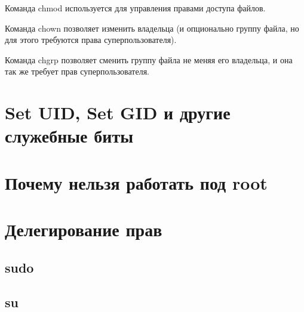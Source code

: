 Команда chmod используется для управления правами доступа файлов.

Команда chown позволяет изменить владельца (и опционально группу файла, но для этого требуются права суперпользователя).

Команда chgrp позволяет сменить группу файла не меняя его владельца, и она так же требует прав суперпользователя.
\section{Set UID, Set GID и другие служебные биты}
\section{Почему нельзя работать под root}
\section{Делегирование прав}
\subsection{sudo}
\subsection{su}
